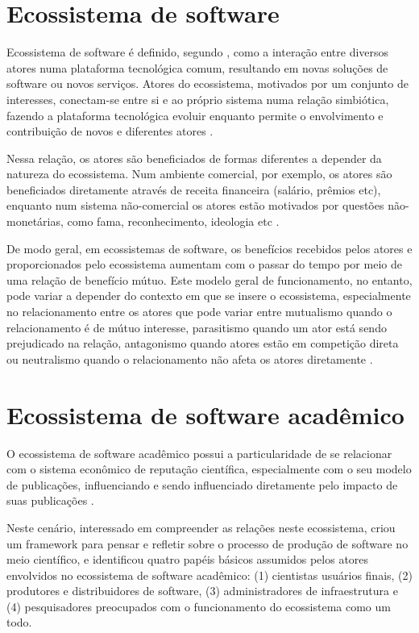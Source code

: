 \section{Ecossistema de software}
\label{sec:ecos}

Ecossistema de software é definido, segundo ,
como a interação entre diversos atores numa plataforma tecnológica comum,
resultando em novas soluções de software ou novos serviços. Atores do
ecossistema, motivados por um conjunto de interesses, conectam-se entre si e ao
próprio sistema numa relação simbiótica, fazendo a plataforma tecnológica
evoluir enquanto permite o envolvimento e contribuição de novos e diferentes
atores \cite{manikas2013software}.

Nessa relação, os atores são beneficiados de formas diferentes a depender da
natureza do ecossistema. Num ambiente comercial, por exemplo, os atores são
beneficiados diretamente através de receita financeira (salário, prêmios etc),
enquanto num sistema não-comercial os atores estão motivados por questões
não-monetárias, como fama, reconhecimento, ideologia etc
\cite{manikas2013software}.

De modo geral, em ecossistemas de software, os benefícios recebidos pelos
atores e proporcionados pelo ecossistema aumentam com o passar do tempo por
meio de uma relação de benefício mútuo. Este modelo geral de funcionamento, no
entanto, pode variar a depender do contexto em que se insere o ecossistema,
especialmente no relacionamento entre os atores que pode variar entre
mutualismo quando o relacionamento é de mútuo interesse, parasitismo quando um
ator está sendo prejudicado na relação, antagonismo quando
atores estão em competição direta ou neutralismo quando o relacionamento
não afeta os atores diretamente
\cite{manikas2013software}.

\section{Ecossistema de software acadêmico}
\label{sec:ecossa}

O ecossistema de software acadêmico possui a particularidade de se relacionar
com o sistema econômico de reputação científica, especialmente com o seu modelo
de publicações, influenciando e sendo influenciado diretamente pelo impacto de
suas publicações \cite{howison2015understanding}.

Neste cenário, interessado em compreender as relações neste ecossistema,
 criou um framework para pensar e refletir
sobre o processo de produção de software no meio científico, e identificou quatro
papéis básicos assumidos pelos atores envolvidos no ecossistema de software acadêmico: 
(1) cientistas usuários finais, (2) produtores e distribuidores de software, (3)
administradores de infraestrutura e (4) pesquisadores preocupados com o
funcionamento do ecossistema como um todo.

